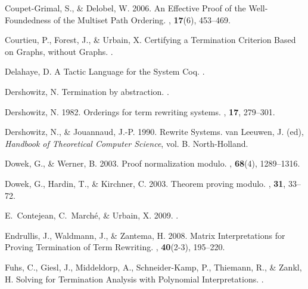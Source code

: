 \begin{thebibliography}{}
Coupet-Grimal, S., \& Delobel, W. 2006.
\newblock An Effective Proof of the Well-Foundedness of the Multiset Path
  Ordering.
, {\bf 17}(6), 453--469.

Courtieu, P., Forest, J., \& Urbain, X.
\newblock Certifying a Termination Criterion Based on Graphs, without Graphs.
.

Delahaye, D.
\newblock A Tactic Language for the System {Coq}.
.

Dershowitz, N.
\newblock Termination by abstraction.
.

Dershowitz, N. 1982.
\newblock Orderings for term rewriting systems.
, {\bf 17}, 279--301.

Dershowitz, N., \& Jouannaud, J.-P. 1990.
\newblock Rewrite Systems.
 van Leeuwen, J. (ed), {\em Handbook of Theoretical
  Computer Science},  vol. B.
\newblock North-Holland.

Dowek, G., \& Werner, B. 2003.
\newblock Proof normalization modulo.
, {\bf 68}(4), 1289--1316.

Dowek, G., Hardin, T., \& Kirchner, C. 2003.
\newblock Theorem proving modulo.
, {\bf 31}, 33--72.

E.~Contejean, C.~March{\'e}, \& Urbain, X. 2009.
.


Endrullis, J., Waldmann, J., \& Zantema, H. 2008.
\newblock Matrix Interpretations for Proving Termination of Term Rewriting.
, {\bf 40}(2-3), 195--220.

Fuhs, C., Giesl, J., Middeldorp, A., Schneider-Kamp, P., Thiemann, R., \&
  Zankl, H.
 Solving for Termination Analysis with Polynomial
  Interpretations.
.


\end{thebibliography}
